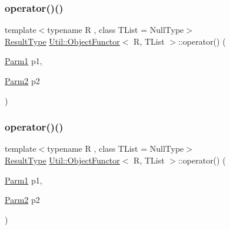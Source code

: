 \subsubsection{\texorpdfstring{operator()()}{operator()()}\hspace{0.1cm}{\footnotesize\ttfamily [5/12]}}
{\footnotesize\ttfamily template$<$typename R , class T\+List  = Null\+Type$>$ \\
\mbox{\hyperlink{classUtil_1_1ObjectFunctor_a77f816e98108848347d0dfc085090a1c}{Result\+Type}} \mbox{\hyperlink{classUtil_1_1ObjectFunctor}{Util\+::\+Object\+Functor}}$<$ R, T\+List $>$\+::operator() (\begin{DoxyParamCaption}\item[{\mbox{\hyperlink{classUtil_1_1ObjectFunctor_a199715d28029627c2ae7219c13b04d26}{Parm1}}}]{p1,  }\item[{\mbox{\hyperlink{classUtil_1_1ObjectFunctor_a6809cf65883dc7575e01d9b9849649cf}{Parm2}}}]{p2 }\end{DoxyParamCaption})\hspace{0.3cm}{\ttfamily [inline]}}

\mbox{\label{classUtil_1_1ObjectFunctor_a95148ad6414e7e28998227841c27be6c}} 
\subsubsection{\texorpdfstring{operator()()}{operator()()}\hspace{0.1cm}{\footnotesize\ttfamily [6/12]}}
{\footnotesize\ttfamily template$<$typename R , class T\+List  = Null\+Type$>$ \\
\mbox{\hyperlink{classUtil_1_1ObjectFunctor_a77f816e98108848347d0dfc085090a1c}{Result\+Type}} \mbox{\hyperlink{classUtil_1_1ObjectFunctor}{Util\+::\+Object\+Functor}}$<$ R, T\+List $>$\+::operator() (\begin{DoxyParamCaption}\item[{\mbox{\hyperlink{classUtil_1_1ObjectFunctor_a199715d28029627c2ae7219c13b04d26}{Parm1}}}]{p1,  }\item[{\mbox{\hyperlink{classUtil_1_1ObjectFunctor_a6809cf65883dc7575e01d9b9849649cf}{Parm2}}}]{p2 }\end{DoxyParamCaption})\hspace{0.3cm}{\ttfamily [inline]}}

